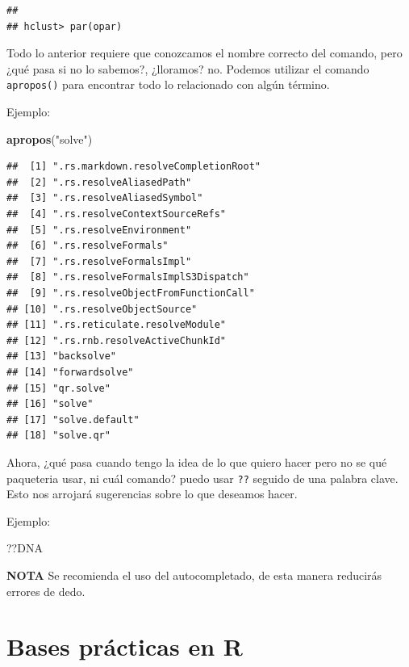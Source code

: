 \documentclass[
]{book}
\newenvironment{Shaded}{\begin{snugshade}}{\end{snugshade}}
\newcommand{\FunctionTok}[1]{\textcolor[rgb]{0.13,0.29,0.53}{\textbf{#1}}}
\newcommand{\NormalTok}[1]{#1}
\newcommand{\StringTok}[1]{\textcolor[rgb]{0.31,0.60,0.02}{#1}}
\begin{document}
\begin{verbatim}
## 
## hclust> par(opar)
\end{verbatim}

Todo lo anterior requiere que conozcamos el nombre correcto del comando, pero ¿qué pasa si no lo sabemos?, ¿lloramos? no.
Podemos utilizar el comando \texttt{apropos()} para encontrar todo lo relacionado con algún término.

Ejemplo:

\begin{Shaded}
\begin{Highlighting}[]
\FunctionTok{apropos}\NormalTok{(}\StringTok{"solve"}\NormalTok{)}
\end{Highlighting}
\end{Shaded}

\begin{verbatim}
##  [1] ".rs.markdown.resolveCompletionRoot"
##  [2] ".rs.resolveAliasedPath"            
##  [3] ".rs.resolveAliasedSymbol"          
##  [4] ".rs.resolveContextSourceRefs"      
##  [5] ".rs.resolveEnvironment"            
##  [6] ".rs.resolveFormals"                
##  [7] ".rs.resolveFormalsImpl"            
##  [8] ".rs.resolveFormalsImplS3Dispatch"  
##  [9] ".rs.resolveObjectFromFunctionCall" 
## [10] ".rs.resolveObjectSource"           
## [11] ".rs.reticulate.resolveModule"      
## [12] ".rs.rnb.resolveActiveChunkId"      
## [13] "backsolve"                         
## [14] "forwardsolve"                      
## [15] "qr.solve"                          
## [16] "solve"                             
## [17] "solve.default"                     
## [18] "solve.qr"
\end{verbatim}

Ahora, ¿qué pasa cuando tengo la idea de lo que quiero hacer pero no se qué paqueteria usar, ni cuál comando? puedo usar \texttt{??} seguido de una palabra clave. Esto nos arrojará sugerencias sobre lo que deseamos hacer.

Ejemplo:

\begin{Shaded}
\begin{Highlighting}[]
\NormalTok{??DNA}
\end{Highlighting}
\end{Shaded}

\textbf{NOTA} Se recomienda el uso del autocompletado, de esta manera reducirás errores de dedo.

\chapter{Bases prácticas en R}\label{bases-pruxe1cticas-en-r}
\end{document}
